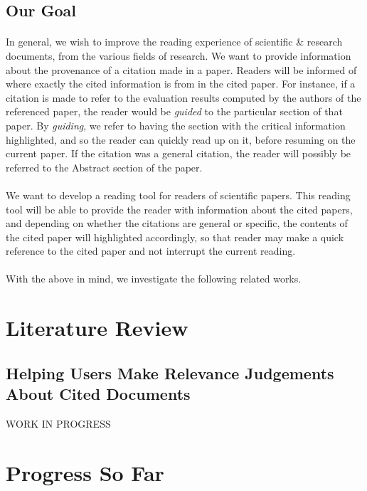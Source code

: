 \documentclass[12 pt]{article}
\begin{document}
\subsection{Our Goal}
\paragraph{}
In general, we wish to improve the reading experience of scientific \& research documents, from the various fields of research. We want to provide information about the provenance of a citation made in a paper. Readers will be informed of where exactly the cited information is from in the cited paper. For instance, if a citation is made to refer to the evaluation results computed by the authors of the referenced paper, the reader would be \textit{guided} to the particular section of that paper. By \textit{guiding}, we refer to having the section with the critical information highlighted, and so the reader can quickly read up on it, before resuming on the current paper. If the citation was a general citation, the reader will possibly be referred to the Abstract section of the paper.

\paragraph{}
We want to develop a reading tool for readers of scientific papers. This reading tool will be able to provide the reader with information about the cited papers, and depending on whether the citations are general or specific, the contents of the cited paper will highlighted accordingly, so that reader may make a quick reference to the cited paper and not interrupt the current reading.

\paragraph{}
With the above in mind, we investigate the following related works.

\section{Literature Review}
\subsection{Helping Users Make Relevance Judgements About Cited Documents}
WORK IN PROGRESS


\section{Progress So Far}
\end{document}
